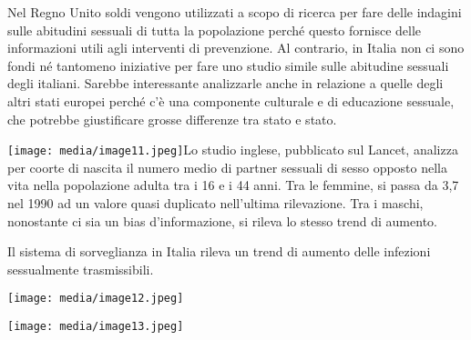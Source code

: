 \documentclass[]{article}
\begin{document}
Nel Regno Unito soldi vengono utilizzati a scopo di ricerca per fare
delle indagini sulle abitudini sessuali di tutta la popolazione perché
questo fornisce delle informazioni utili agli interventi di prevenzione.
Al contrario, in Italia non ci sono fondi né tantomeno iniziative per
fare uno studio simile sulle abitudine sessuali degli italiani. Sarebbe
interessante analizzarle anche in relazione a quelle degli altri stati
europei perché c'è una componente culturale e di educazione sessuale,
che potrebbe giustificare grosse differenze tra stato e stato.

\texttt{[image: media/image11.jpeg]}Lo studio inglese, pubblicato sul
Lancet, analizza per coorte di nascita il numero medio di partner
sessuali di sesso opposto nella vita nella popolazione adulta tra i 16 e
i 44 anni. Tra le femmine, si passa da 3,7 nel 1990 ad un valore quasi
duplicato nell'ultima rilevazione. Tra i maschi, nonostante ci sia un
bias d'informazione, si rileva lo stesso trend di aumento.

Il sistema di sorveglianza in Italia rileva un trend di aumento delle
infezioni sessualmente trasmissibili.

\texttt{[image: media/image12.jpeg]}

\texttt{[image: media/image13.jpeg]}
\end{document}
